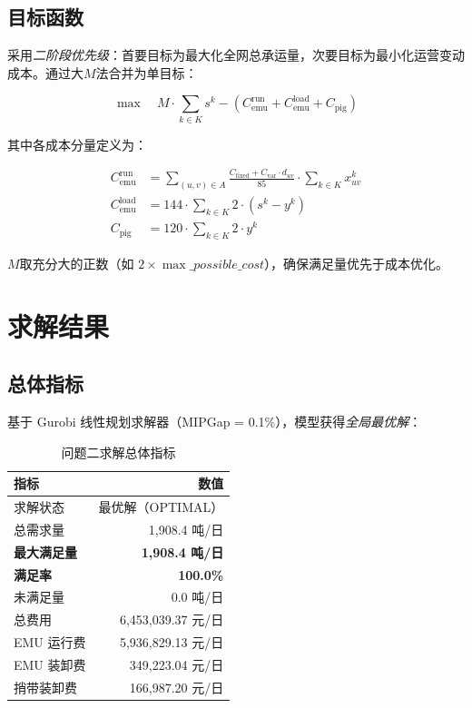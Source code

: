 \documentclass[12pt,a4paper,fontset=none]{ctexart}
\begin{document}
\subsection{目标函数}

采用\emph{二阶段优先级}：首要目标为最大化全网总承运量，次要目标为最小化运营变动成本。通过大$M$法合并为单目标：

\begin{equation}
\max \quad M \cdot \sum_{k \in K} s^k - \left( C_{\text{emu}}^{\text{run}} + C_{\text{emu}}^{\text{load}} + C_{\text{pig}} \right)
\end{equation}

其中各成本分量定义为：

\begin{align}
C_{\text{emu}}^{\text{run}} &= \sum_{(u,v) \in A} \frac{C_{\text{fixed}} + C_{\text{var}} \cdot d_{uv}}{85} \cdot \sum_{k \in K} x_{uv}^k \\[4pt]
C_{\text{emu}}^{\text{load}} &= 144 \cdot \sum_{k \in K} 2 \cdot (s^k - y^k) \\[4pt]
C_{\text{pig}} &= 120 \cdot \sum_{k \in K} 2 \cdot y^k
\end{align}

$M$取充分大的正数（如 $2 \times \max\_possible\_cost$），确保满足量优先于成本优化。

\section{求解结果}

\subsection{总体指标}

基于 Gurobi 线性规划求解器（MIPGap = 0.1\%），模型获得\emph{全局最优解}：

\begin{table}[H]
\centering
\caption{问题二求解总体指标}
\begin{tabular}{lr}
\toprule
\textbf{指标} & \textbf{数值} \\
\midrule
求解状态 & 最优解（OPTIMAL） \\
总需求量 & 1,908.4 吨/日 \\
\rowcolor{blue!10} \textbf{最大满足量} & \textbf{1,908.4 吨/日} \\
\rowcolor{blue!10} \textbf{满足率} & \textbf{100.0\%} \\
未满足量 & 0.0 吨/日 \\
\midrule
总费用 & 6,453,039.37 元/日 \\
\quad EMU 运行费 & 5,936,829.13 元/日 \\
\quad EMU 装卸费 & 349,223.04 元/日 \\
\quad 捎带装卸费 & 166,987.20 元/日 \\
\bottomrule
\end{tabular}
\end{table}
\end{document}
